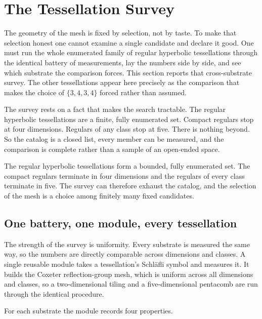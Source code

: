 \section{The Tessellation Survey}

The geometry of the mesh is fixed by selection, not by taste. To make that selection honest one cannot examine a single candidate and declare it good. One must run the whole enumerated family of regular hyperbolic tessellations through the identical battery of measurements, lay the numbers side by side, and see which substrate the comparison forces. This section reports that cross-substrate survey. The other tessellations appear here precisely as the comparison that makes the choice of $\{3,4,3,4\}$ forced rather than assumed.

The survey rests on a fact that makes the search tractable. The regular hyperbolic tessellations are a finite, fully enumerated set. Compact regulars stop at four dimensions. Regulars of any class stop at five. There is nothing beyond. So the catalog is a closed list, every member can be measured, and the comparison is complete rather than a sample of an open-ended space.

\begin{principle}
The regular hyperbolic tessellations form a bounded, fully enumerated set. The compact regulars terminate in four dimensions and the regulars of every class terminate in five. The survey can therefore exhaust the catalog, and the selection of the mesh is a choice among finitely many fixed candidates.
\end{principle}

\subsection{One battery, one module, every tessellation}

The strength of the survey is uniformity. Every substrate is measured the same way, so the numbers are directly comparable across dimensions and classes. A single reusable module takes a tessellation's Schl\"afli symbol and measures it. It builds the Coxeter reflection-group mesh, which is uniform across all dimensions and classes, so a two-dimensional tiling and a five-dimensional pentacomb are run through the identical procedure.

For each substrate the module records four properties.

